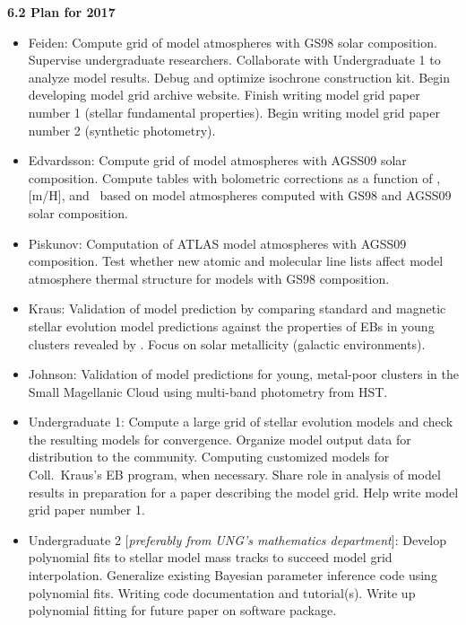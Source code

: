 {\bf 6.2 Plan for 2017}

\begin{itemize}
	\item[] Feiden: Compute grid of model atmospheres with GS98 solar composition. Supervise undergraduate researchers. Collaborate with Undergraduate 1 to analyze model results. Debug and optimize isochrone construction kit. Begin developing model grid archive website. Finish writing model grid paper number 1 (stellar fundamental properties). Begin writing model grid paper number 2 (synthetic photometry). \\
	
	\item[] Edvardsson: Compute grid of model atmospheres with AGSS09 solar composition. Compute tables with bolometric corrections as a function of \logg, [m/H], and \teff\ based on model atmospheres computed with GS98 and AGSS09 solar composition. \\
	
	\item[] Piskunov: Computation of ATLAS model atmospheres with AGSS09 composition. Test whether new atomic and molecular line lists affect model atmosphere thermal structure for models with GS98 composition. \\
	
	\item[] Kraus: Validation of model prediction by comparing standard and magnetic stellar evolution model predictions against the properties of EBs in young clusters revealed by \kepler. Focus on solar metallicity (galactic environments). \\
	
	\item[] Johnson: Validation of model predictions for young, metal-poor clusters in the Small Magellanic Cloud using multi-band photometry from HST. \\
	
	\item[] Undergraduate 1: Compute a large grid of stellar evolution models and check the resulting models for convergence. Organize model output data for distribution to the community. Computing customized models for Coll.\ Kraus's EB program, when necessary. Share role in analysis of model results in preparation for a paper describing the model grid. Help write model grid paper number 1. \\
	
	\item[] Undergraduate 2 [{\it preferably from UNG's mathematics department}]: Develop polynomial fits to stellar model mass tracks to succeed model grid interpolation. Generalize existing Bayesian parameter inference code using polynomial fits. Writing code documentation and tutorial(s). Write up polynomial fitting for future paper on software package. \\
\end{itemize} 

